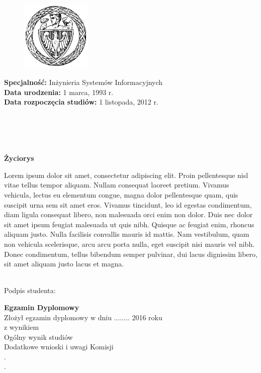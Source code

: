 \begin{figure}
  \vspace{-20pt}
  \begin{center}
    \includegraphics[width=0.30\textwidth]{tytulowa_res/logo_pw.png}
  \end{center}
  \vspace{-20pt}
\end{figure}

\noindent
\textbf{Specjalność: }Inżynieria Systemów Informacyjnych\\
\textbf{Data urodzenia: }1 marca, 1993 r.\\
\textbf{Data rozpoczęcia studiów: }1 listopada, 2012 r. \ \\\\\\\\\\

\begin{center}
    \large{\textbf{Życiorys}}
\end{center}
Lorem ipsum dolor sit amet, consectetur adipiscing elit. Proin pellentesque nisl vitae tellus tempor aliquam. Nullam consequat laoreet pretium. Vivamus vehicula, lectus eu elementum congue, magna dolor pellentesque quam, quis suscipit urna sem sit amet eros. Vivamus tincidunt, leo id egestas condimentum, diam ligula consequat libero, non malesuada orci enim non dolor. Duis nec dolor sit amet ipsum feugiat malesuada ut quis nibh. Quisque ac feugiat enim, rhoncus aliquam justo. Nulla facilisis convallis mauris id mattis. Nam vestibulum, quam non vehicula scelerisque, arcu arcu porta nulla, eget suscipit nisi mauris vel nibh. Donec condimentum, tellus bibendum semper pulvinar, dui lacus dignissim libero, sit amet aliquam justo lacus et magna.\\\\

\begin{flushright}
    \begin{minipage}{.5\linewidth}
        \dotfill
        \begin{flushright}
            Podpis studenta:
        \end{flushright}
    \end{minipage}
\end{flushright}

\vfill

\noindent
\large{\textbf{Egzamin Dyplomowy}}\\
Złożył egzamin dyplomowy w dniu ........ 2016 roku\\
z wynikiem \dotfill\\
Ogólny wynik studiów \dotfill\\
Dodatkowe wnioski i uwagi Komisji \dotfill\\
.\dotfill\\
.\dotfill
